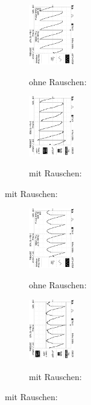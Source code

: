 \begin{figure}
\caption{$U_{out} (\phi = 270°$)}
\begin{subfigure}{0.48\textwidth}
\centering
\caption{ohne Rauschen:}
\includegraphics[angle=90,height=2.6cm]{graphics/ALL0035/F0035TEK.jpg}
\label{fig:phi270o}
\end{subfigure}
\begin{subfigure}{0.48\textwidth}
\centering
\caption{mit Rauschen:}
\includegraphics[angle=90,height=2.6cm]{graphics/ALL0043/F0043TEK.jpg}
\label{fig:phi270m}
\end{subfigure}
\end{figure}

\begin{figure}
\caption{$U_{out} (\phi = 210°$)}
\begin{subfigure}{0.48\textwidth}
\centering
\caption{ohne Rauschen:}
\includegraphics[angle=90,height=2.6cm]{graphics/ALL0036/F0036TEK.jpg}
\label{fig:phi210o}
\end{subfigure}
\begin{subfigure}{0.48\textwidth}
\centering
\caption{mit Rauschen:}
\includegraphics[angle=90,height=2.6cm]{graphics/ALL0044/F0044TEK.jpg}
\label{fig:phi210m}
\end{subfigure}
\end{figure}

